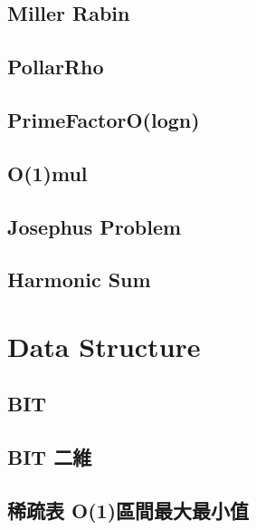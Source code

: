 \subsection{Miller Rabin}


\subsection{PollarRho}


\subsection{PrimeFactorO(logn)}


\subsection{O(1)mul}


\subsection{Josephus Problem}


\subsection{Harmonic Sum}


\section{Data Structure}

\subsection{BIT}


\subsection{BIT 二維}


\subsection{稀疏表 O(1)區間最大最小值}


